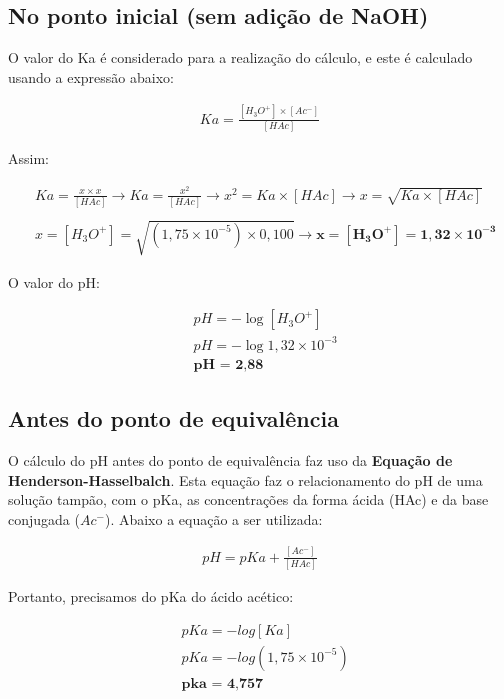 \documentclass[a4paper, 12pt]{article}
\begin{document}
\subsection{No ponto inicial (sem adição de NaOH)}
O valor do Ka é considerado para a realização do cálculo, e este é calculado usando a expressão abaixo:
\begin{fleqn}
\begin{align*}
	Ka = \frac{[H_{3}O^{+}] \times [Ac^{-}]}{[HAc]}
\end{align*}
\end{fleqn}
Assim:
\begin{fleqn}
\begin{align*}
	& Ka = \frac{x \times x}{[HAc]} \longrightarrow	Ka = \frac{x^{2}}{[HAc]} \rightarrow x^{2} = Ka \times [HAc] \longrightarrow	 x = \sqrt{Ka \times [HAc]} \\ \\
	& x = [H_{3}O^{+}] = \sqrt{(1,75 \times 10^{-5}) \times 0,100} \longrightarrow	\mathbf{x = [H_{3}O^{+}] = 1,32 \times 10^{-3}}
\end{align*}
\end{fleqn}
O valor do pH:
\begin{fleqn}
\begin{align*}
	& pH = - \log [H_{3}O^{+}] \\
	& pH = - \log {1,32 \times 10^{-3}} \\
	& \textbf{pH = 2,88}
\end{align*}
\end{fleqn}

\subsection{Antes do ponto de equivalência}
O cálculo do pH antes do ponto de equivalência faz uso da \textbf{Equação de Henderson-Hasselbalch}. Esta equação faz o relacionamento do pH de uma solução tampão, com o pKa, as concentrações da forma ácida (HAc) e da base conjugada ($Ac^{-}$). Abaixo a equação a ser utilizada:
\begin{fleqn}
\begin{align*}
	pH = pKa + \frac{[Ac^{-}]}{[HAc]}
\end{align*}
\end{fleqn}
Portanto, precisamos do pKa do ácido acético:
\begin{fleqn}
\begin{align*}
	& pKa = -log [Ka] \\
	& pKa = -log (1,75 \times 10^{-5}) \\
	& \textbf{pka = 4,757}
\end{align*}
\end{fleqn}
\end{document}
